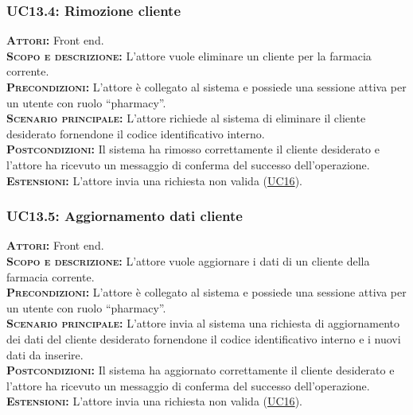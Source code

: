 \subsubsection{UC13.4: Rimozione cliente}
\label{sec:UC134}
\textsc{\textbf{Attori:}} Front end.\\
\textsc{\textbf{Scopo e descrizione:}} L'attore vuole eliminare un cliente per la farmacia corrente.\\
\textsc{\textsc{\textbf{Precondizioni:}}} L'attore è collegato al sistema e possiede una sessione attiva per un utente con ruolo ``pharmacy''.\\
\textsc{\textbf{Scenario principale:}} L'attore richiede al sistema di eliminare il cliente desiderato fornendone il codice identificativo interno.\\
\textsc{\textbf{Postcondizioni:}} Il sistema ha rimosso correttamente il cliente desiderato e l'attore ha ricevuto un messaggio di conferma del successo dell'operazione.\\
\textsc{\textbf{Estensioni:}} L'attore invia una richiesta non valida (\hyperref[sec:UC16]{UC16}).

\subsubsection{UC13.5: Aggiornamento dati cliente}
\label{sec:UC135}
\textsc{\textbf{Attori:}} Front end.\\
\textsc{\textbf{Scopo e descrizione:}} L'attore vuole aggiornare i dati di un cliente della farmacia corrente.\\
\textsc{\textsc{\textbf{Precondizioni:}}} L'attore è collegato al sistema e possiede una sessione attiva per un utente con ruolo ``pharmacy''.\\
\textsc{\textbf{Scenario principale:}} L'attore invia al sistema una richiesta di aggiornamento dei dati del cliente desiderato fornendone il codice identificativo interno e i nuovi dati da inserire.\\
\textsc{\textbf{Postcondizioni:}} Il sistema ha aggiornato correttamente il cliente desiderato e l'attore ha ricevuto un messaggio di conferma del successo dell'operazione.\\
\textsc{\textbf{Estensioni:}} L'attore invia una richiesta non valida (\hyperref[sec:UC16]{UC16}).

